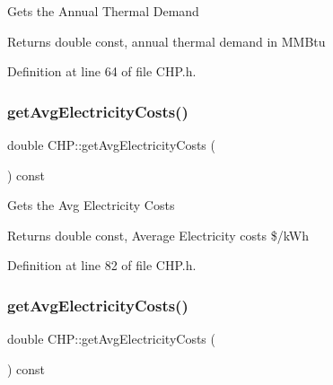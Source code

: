 Gets the Annual Thermal Demand

\begin{DoxyReturn}{Returns}
double const, annual thermal demand in M\+M\+Btu 
\end{DoxyReturn}


Definition at line 64 of file C\+H\+P.\+h.

\mbox{\label{class_c_h_p_a2bc5ac0eb3d7ce42f77f26b3973f6c9f}} 
\subsubsection{\texorpdfstring{get\+Avg\+Electricity\+Costs()}{getAvgElectricityCosts()}\hspace{0.1cm}{\footnotesize\ttfamily [1/3]}}
{\footnotesize\ttfamily double C\+H\+P\+::get\+Avg\+Electricity\+Costs (\begin{DoxyParamCaption}{ }\end{DoxyParamCaption}) const\hspace{0.3cm}{\ttfamily [inline]}}

Gets the Avg Electricity Costs

\begin{DoxyReturn}{Returns}
double const, Average Electricity costs \$/k\+Wh 
\end{DoxyReturn}


Definition at line 82 of file C\+H\+P.\+h.

\mbox{\label{class_c_h_p_a2bc5ac0eb3d7ce42f77f26b3973f6c9f}} 
\subsubsection{\texorpdfstring{get\+Avg\+Electricity\+Costs()}{getAvgElectricityCosts()}\hspace{0.1cm}{\footnotesize\ttfamily [2/3]}}
{\footnotesize\ttfamily double C\+H\+P\+::get\+Avg\+Electricity\+Costs (\begin{DoxyParamCaption}{ }\end{DoxyParamCaption}) const\hspace{0.3cm}{\ttfamily [inline]}}

